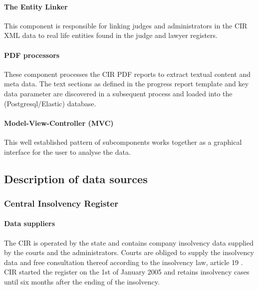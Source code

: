 \paragraph{The Entity Linker} This component is responsible for linking judges and administrators in the CIR XML data to real life entities found in the judge and lawyer registers. 

\paragraph{PDF processors}
These component processes the CIR PDF reports to extract textual content and meta data. The text sections as defined in the progress report template and key data parameter are discovered in a subsequent process and loaded into the (Postgresql/Elastic) database.

\paragraph{Model-View-Controller (MVC)}
This well established pattern of subcomponents works together as a graphical interface for the user to analyse the data. 

\subsection{Description of data sources}
\subsubsection{Central Insolvency Register}
\paragraph{Data suppliers}
The CIR \cite{rechtspraak:1} is operated by the state and contains company insolvency data supplied by the courts and the administrators. Courts are obliged to supply the insolvency data and free consultation thereof according to the insolvency law, article 19 \cite{law:1}. CIR started the register on the 1st of January 2005 and retains insolvency cases until six months after the ending of the insolvency.

